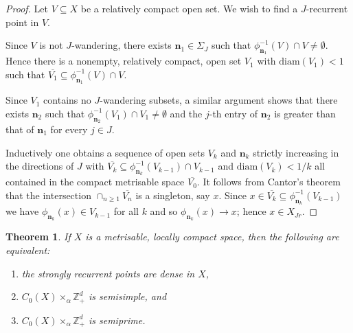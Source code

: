 \documentclass[12pt]{amsart}
\newtheorem{theorem}{Theorem}
\theoremstyle{definition}
\newcommand{\bbZ}{\mathbb{Z}}
\newcommand{\bo}[1]{\mathbf{#1}}
\newcommand{\bom}{\mathbf{m}}
\newcommand{\bon}{\mathbf{n}}
\begin{document}
\begin{proof}
Let $V\subseteq X$ be a relatively compact open set. We wish to
find a $J$-recurrent point in $V$.

Since $V$ is not $J$-wandering, there exists $\bon_1\in\Sigma_J$
such that $\phi_{\bon_1}^{-1}(V)\cap V\neq\emptyset$.
Hence there is a nonempty, relatively compact, open set $V_1$
with $\mathrm{diam}(V_1)<1$ such that
$\overline{V_1}\subseteq\phi _{\bon_1}^{-1}(V)\cap V$.

Since $V_1$ contains no $J$-wandering subsets, a similar argument
shows that there exists $\bon_2$ such that
$\phi_{\bon_2}^{-1}(V_1)\cap V_1\neq\emptyset$ and the $j$-th
entry of $\bon_2$ is greater than that of $\bon_1$ for every $j\in
J$.
\begin{comment}
\footnote{(Delete before
submitting) \emph{Proof. } The set $V_1$ is not $J$-wandering, hence
there is $\bom\in\Sigma_J$ s.t. $\phi_{\bom}^{-1}(V_1)\cap
V_1 \equiv W_1\neq\emptyset$. The set $W_1$ is not
$J$-wandering, hence there is $\bo{k}\in\Sigma_J$ s.t.
$\phi_{\bo{k}}^{-1}(W_1)\cap W_1\neq\emptyset$, hence
\[
\phi_{\bo{m+k}}^{-1}(V_1)\cap V_1 \supseteq
\phi_{\bo{k}}^{-1}((\phi_{\bom}(V_1))\cap V_1) \cap
(\phi_{\bom}^{-1}(V_1)\cap V_1) =
\phi_{\bo{k}}^{-1}(W_1)\cap W_1\neq\emptyset.
\]
Set $\bon_1 = \bom, \, \bon_2 = \bon_1 + \bo{k}$  and continue.}
\end{comment}

Inductively one obtains a sequence of open sets $V_{k}$ and
$\bon_{k}$ strictly increasing in the directions of $J$ with
$\overline{V_{k}}\subseteq
\phi_{\bon_{k}}^{-1}(V_{k-1})\cap V_{k-1}$ and $\mathrm{diam}%
(V_{k})<1/k$ all contained in the compact metrisable space
$\overline{V_{0}}$. It follows from Cantor's theorem that the
intersection $\cap_{n\geq1}\overline{V_{n}}$ is a singleton, say
$x$. Since
$x\in\overline{V_{k}}\subseteq\phi_{\bon_{k}}^{-1}(V_{k-1})$ we
have $\phi_{\bon_{k}}(x)\in V_{k-1}$ for all $k$ and so $\phi
_{\bon_{k}}(x)\rightarrow x$; hence $x\in X_{Jr}$.
\end{proof}

\begin{theorem} \label{sem}
If $X$ is a metrisable, locally compact space, then the following
are equivalent:
\begin{enumerate}
\item the strongly recurrent points are dense in $X$,
\item $C_0(X)\times_\alpha\bbZ_+^d$ is semisimple, and
\item $C_0(X)\times_\alpha\bbZ_+^d$ is semiprime.
\end{enumerate}
\end{theorem}
\end{document}
